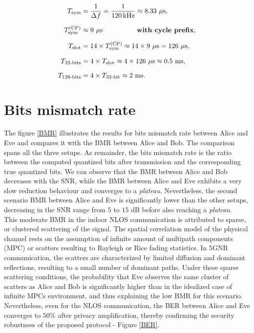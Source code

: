 \begin{align}
T_{\text{sym}} 
&= \frac{1}{\Delta f}
 = \frac{1}{120\,\text{kHz}}
 \approx 8.33~\mu\text{s}, 
 \label{eq:tsym} \\[6pt]
T_{\text{sym}}^{\text{(CP)}} 
&\approx 9~\mu\text{s} \quad \quad\quad\quad \quad \text{\textbf{with cycle prefix}},
 \label{eq:tsym_cp} \\[6pt]
T_{\text{slot}} 
&= 14 \times T_{\text{sym}}^{\text{(CP)}}
 \approx 14 \times 9~\mu\text{s}
 = 126~\mu\text{s},
 \label{eq:tslot} \\[6pt]
T_{32\text{-bits}} 
&= 4 \times T_{\text{slot}}
 \approx 4 \times 126~\mu\text{s}
 \approx 0.5~\text{ms},
 \label{eq:t32} \\[6pt]
T_{128\text{-bits}} 
&= 4 \times T_{32\text{-bit}}
 \approx 2~\text{ms}.
 \label{eq:t128}
\end{align}

\section{Bits mismatch rate}

The figure \ref{BMR} illustrates the results for bits mismatch rate between Alice and Eve and compares it with the BMR between Alice and Bob.  The comparison spans all the three setups.  As remainder, the bits mismatch rate is the ratio between the computed quantized bits after transmission and the corresponding true quantized bits.  We can observe that the BMR between Alice and Bob decreases with the SNR, while the BMR between Alice and Eve exhibits a very slow reduction behaviour and converges to a \textit{plateau}.  Nevertheless, the second scenario BMR between Alice and Eve is significantly lower than the other setups, decreasing in the SNR range from $5$ to $15$ dB before also reaching a \textit{plateau}.\\  This moderate BMR in the indoor NLOS communication is attributed to sparse, or clustered scattering of the signal. The spatial correlation model of the physical channel rests on the assumption of infinite amount of multipath components (MPC) or scatters resulting to Rayleigh or Rice fading statistics.  In 5GNR communication, the scatters are characterized by limited diffusion and dominant reflections, resulting to a small number of dominant paths.  Under these sparse scattering conditions, the probability that Eve observes the same cluster of scatters as Alice and Bob is significantly higher than in the idealized case of infinite MPCs environment, and thus explaining the low BMR for this scenario.\\
Nevertheless, even for the NLOS communication, the BER between Alice and Eve converges to $50\%$ after privacy amplification, thereby confirming the security robustness of the proposed protocol - Figure \ref{BER}.

